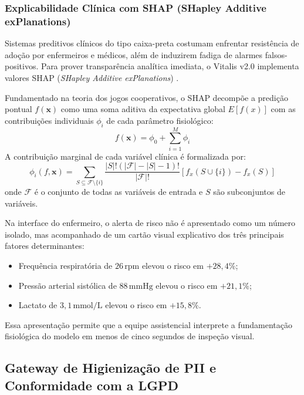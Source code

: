 \subsubsection{Explicabilidade Clínica com SHAP (SHapley Additive exPlanations)}
Sistemas preditivos clínicos do tipo caixa-preta costumam enfrentar resistência de adoção por enfermeiros e médicos, além de induzirem fadiga de alarmes falsos-positivos. Para prover transparência analítica imediata, o Vitalis v2.0 implementa valores SHAP (\textit{SHapley Additive exPlanations}) \cite{lundberg_shap:2017}.

Fundamentado na teoria dos jogos cooperativos, o SHAP decompõe a predição pontual $f(\mathbf{x})$ como uma soma aditiva da expectativa global $E[f(x)]$ com as contribuições individuais $\phi_i$ de cada parâmetro fisiológico:
\begin{equation}
    f(\mathbf{x}) = \phi_0 + \sum_{i=1}^{M} \phi_i
\end{equation}
A contribuição marginal de cada variável clínica é formalizada por:
\begin{equation}
    \phi_i(f, \mathbf{x}) = \sum_{S \subseteq \mathcal{F} \setminus \{i\}} \frac{|S|!(|\mathcal{F}| - |S| - 1)!}{|\mathcal{F}|!} \left[ f_x(S \cup \{i\}) - f_x(S) \right]
\end{equation}
onde $\mathcal{F}$ é o conjunto de todas as variáveis de entrada e $S$ são subconjuntos de variáveis.

Na interface do enfermeiro, o alerta de risco não é apresentado como um número isolado, mas acompanhado de um cartão visual explicativo dos três principais fatores determinantes:
\begin{itemize}[noitemsep]
    \item Frequência respiratória de $26\,\text{rpm}$ elevou o risco em $+28{,}4\%$;
    \item Pressão arterial sistólica de $88\,\text{mmHg}$ elevou o risco em $+21{,}1\%$;
    \item Lactato de $3{,}1\,\text{mmol/L}$ elevou o risco em $+15{,}8\%$.
\end{itemize}
Essa apresentação permite que a equipe assistencial interprete a fundamentação fisiológica do modelo em menos de cinco segundos de inspeção visual.

\subsection{Gateway de Higienização de PII e Conformidade com a LGPD}
\label{subsec:ia_gateway_pii}


